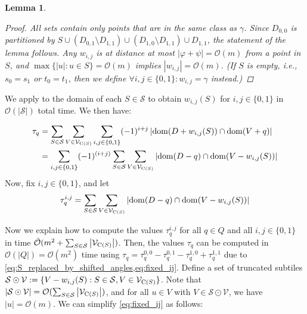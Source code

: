 \documentclass[11pt, letterpaper]{article}
\theoremstyle{plain}
\newtheorem{lemma}{Lemma}
\theoremstyle{definition}
\theoremstyle{remark}
\renewcommand{\O}{\mathcal{O}}
\newcommand{\tO}{\tilde{\mathcal{O}}}
\renewcommand{\S}{\mathcal{S}}
\newcommand{\V}{\mathcal{V}}
\renewcommand{\phi}{\varphi}
\newcommand{\absolute}[1]{\left\lvert#1\right\rvert}
\begin{document}
\begin{lemma}
\begin{proof}
\vspace{.5\baselineskip}

All sets contain only points that are in the same class as $\gamma$. 
Since $D_{0,0}$ is partitioned by $S \cup (D_{0, 1}\setminus D_{1, 1}) \cup (D_{1, 0}\setminus D_{1, 1}) \cup D_{1, 1}$, the statement of the lemma follows. 
Any $w_{i, j}$ is at distance at most $\absolute{\phi + \psi} = \O(m)$ from a point in $S$, and $\max \{\absolute{u} : u \in S\} = \O(m)$ implies $\absolute{w_{i,j}} = \O(m)$. 
(If $S$ is empty, i.e., $s_0 = s_1$ or $t_0 = t_1$, then we define $\forall i,j\in\{0, 1\} : w_{i,j} = \gamma$ instead.)
\end{proof}

\end{lemma}


We apply  to the domain of each $S\in \S$ to obtain $w_{i, j}(S)$ for $i,j \in \{0,1\}$ in $\O(\absolute{\S})$ total time. We then have:

\begin{align}
\label{eq:S_replaced_by_shifted_angles}
\begin{split}
\tau_q &= \sum_{S \in \S} \sum_{V \in \V_{\getchar{S}}} \sum_{i,j \in \{0,1\}} (-1)^{i+j} \absolute{\d{D+w_{i, j}(S)} \cap \d{V + q}} \\
& = \sum_{i,j \in \{0,1\}} (-1)^{(i+j)} \sum_{S \in \S} \sum_{V \in \V_{\getchar{S}}} \absolute{\d{D-q} \cap \d{V-w_{i, j}(S)}}
\end{split}
\end{align}
%
Now, fix $i,j \in \{0,1\}$, and let 
%
\begin{equation}
\label{eq:fixed_ij}
\tau_q^{i,j} = \sum_{S \in \S} \sum_{V \in \V_{\getchar{S}}} \absolute{\d{D-q} \cap \d{V-w_{i, j}(S)}}
\end{equation}

Now we explain how to compute the values $\tau_q^{i,j}$ for all $q \in Q$ and all $i,j \in \{0,1\}$ in time $\tO(m^2 + \sum_{S \in \S} \absolute{\V_{\getchar{S}}})$. Then, the values $\tau_q$ can be computed in $\O(\absolute{Q}) = \O(m^2)$ time using $\tau_q = \tau^{0,0}_q - \tau^{0,1}_q - \tau^{1,0}_q + \tau^{1,1}_q$ due to \cref{eq:S_replaced_by_shifted_angles,eq:fixed_ij}. 
Define a set of truncated subtiles $\S \odot \V := \{V-w_{i, j}(S) : S \in \S, V \in \V_{\getchar{S}}\}$.  Note that $\absolute{\S \odot \V} = \O(\sum_{S \in \S} \absolute{\V_{\getchar{S}}})$, and for all $u \in V$ with $V \in \S \odot \V$, we have $\absolute{u} = \O(m)$. We can simplify \cref{eq:fixed_ij} as follows:
\end{document}
